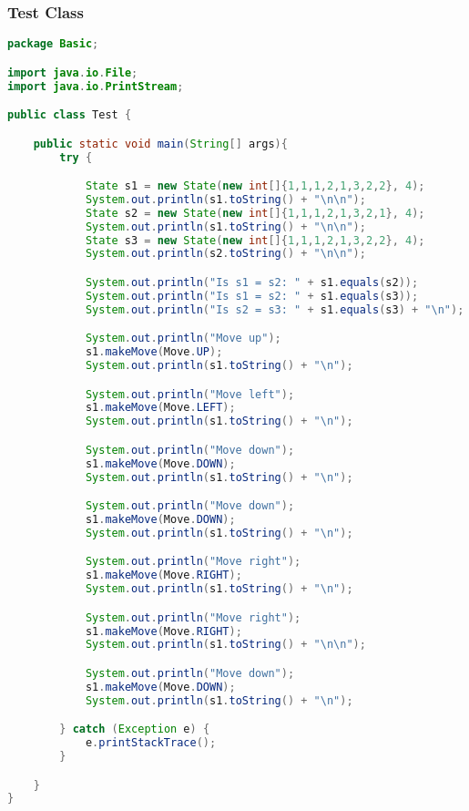 \documentclass[a4paper, 11pt]{article} %
\begin{document}
\subsubsection{Test Class}
\begin{lstlisting}[language=java]
package Basic;

import java.io.File;
import java.io.PrintStream;

public class Test {

    public static void main(String[] args){
        try {

            State s1 = new State(new int[]{1,1,1,2,1,3,2,2}, 4);
            System.out.println(s1.toString() + "\n\n");
            State s2 = new State(new int[]{1,1,1,2,1,3,2,1}, 4);
            System.out.println(s1.toString() + "\n\n");
            State s3 = new State(new int[]{1,1,1,2,1,3,2,2}, 4);
            System.out.println(s2.toString() + "\n\n");

            System.out.println("Is s1 = s2: " + s1.equals(s2));
            System.out.println("Is s1 = s2: " + s1.equals(s3));
            System.out.println("Is s2 = s3: " + s1.equals(s3) + "\n");

            System.out.println("Move up");
            s1.makeMove(Move.UP);
            System.out.println(s1.toString() + "\n");

            System.out.println("Move left");
            s1.makeMove(Move.LEFT);
            System.out.println(s1.toString() + "\n");

            System.out.println("Move down");
            s1.makeMove(Move.DOWN);
            System.out.println(s1.toString() + "\n");

            System.out.println("Move down");
            s1.makeMove(Move.DOWN);
            System.out.println(s1.toString() + "\n");

            System.out.println("Move right");
            s1.makeMove(Move.RIGHT);
            System.out.println(s1.toString() + "\n");

            System.out.println("Move right");
            s1.makeMove(Move.RIGHT);
            System.out.println(s1.toString() + "\n\n");

            System.out.println("Move down");
            s1.makeMove(Move.DOWN);
            System.out.println(s1.toString() + "\n");

        } catch (Exception e) {
            e.printStackTrace();
        }

    }
}

\end{lstlisting}
\end{document}
